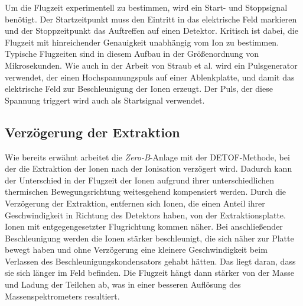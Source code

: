 Um die Flugzeit experimentell zu bestimmen, wird ein Start- und Stoppsignal benötigt. Der Startzeitpunkt muss den Eintritt in das elektrische Feld markieren und der Stoppzeitpunkt das Auftreffen auf einen Detektor. Kritisch ist dabei, die Flugzeit mit hinreichender Genauigkeit unabhängig vom Ion zu bestimmen. Typische Flugzeiten sind in diesem Aufbau in der Größenordnung von Mikrosekunden. Wie auch in der Arbeit von Straub et al. wird ein Pulsgenerator verwendet, der einen Hochspannungspuls auf einer Ablenkplatte, und damit das elektrische Feld zur Beschleunigung der Ionen erzeugt. Der Puls, der diese Spannung triggert wird auch als Startsignal verwendet.

\subsection{Verzögerung der Extraktion}
Wie bereits erwähnt arbeitet die \textit{Zero-B}-Anlage mit der DETOF-Methode, bei der die Extraktion der Ionen nach der Ionisation verzögert wird. Dadurch kann der Unterschied in der Flugzeit der Ionen aufgrund ihrer unterschiedlichen thermischen Bewegungsrichtung weitesgehend kompensiert werden. Durch die Verzögerung der Extraktion, entfernen sich Ionen, die einen Anteil ihrer Geschwindigkeit in Richtung des Detektors haben, von der Extraktionsplatte. Ionen mit entgegengesetzter Flugrichtung kommen näher. Bei anschließender Beschleunigung werden die Ionen stärker beschleunigt, die sich näher zur Platte bewegt haben und ohne Verzögerung eine kleinere Geschwindigkeit beim Verlassen des Beschleunigungskondensators gehabt hätten. Das liegt daran, dass sie sich länger im Feld befinden. Die Flugzeit hängt dann stärker von der Masse und Ladung der Teilchen ab, was in einer besseren Auflösung des Massenspektrometers resultiert.

